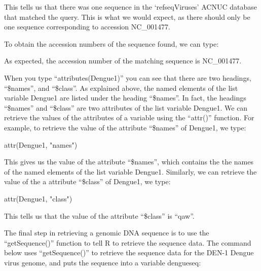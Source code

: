 \documentclass[
]{book}
\newenvironment{Shaded}{\begin{snugshade}}{\end{snugshade}}
\newcommand{\FunctionTok}[1]{\textcolor[rgb]{0.00,0.00,0.00}{#1}}
\newcommand{\NormalTok}[1]{#1}
\newcommand{\SpecialCharTok}[1]{\textcolor[rgb]{0.00,0.00,0.00}{#1}}
\newcommand{\StringTok}[1]{\textcolor[rgb]{0.31,0.60,0.02}{#1}}
\begin{document}
This tells us that there was one sequence in the `refseqViruses' ACNUC database that matched the query. This is what we would expect, as there should only be one sequence corresponding to accession NC\_001477.

To obtain the accession numbers of the sequence found, we can type:

\begin{Shaded}
\end{Shaded}

As expected, the accession number of the matching sequence is NC\_001477.

When you type ``attributes(Dengue1)'' you can see that there are two headings, ``\$names'', and ``\$class''. As explained above, the named elements of the list variable Dengue1 are listed under the heading ``\$names''. In fact, the headings ``\$names'' and ``\$class'' are two attributes of the list variable Dengue1. We can retrieve the values of the attributes of a variable using the ``attr()'' function. For example, to retrieve the value of the attribute ``\$names'' of Dengue1, we type:

\begin{Shaded}
\begin{Highlighting}[]
\FunctionTok{attr}\NormalTok{(Dengue1, }\StringTok{"names"}\NormalTok{)}
\end{Highlighting}
\end{Shaded}

This gives us the value of the attribute ``\$names'', which contains the the names of the named elements of the list variable Dengue1. Similarly, we can retrieve the value of the a attribute ``\$class'' of Dengue1, we type:

\begin{Shaded}
\begin{Highlighting}[]
\FunctionTok{attr}\NormalTok{(Dengue1, }\StringTok{"class"}\NormalTok{)}
\end{Highlighting}
\end{Shaded}

This tells us that the value of the attribute ``\$class'' is ``qaw''.

The final step in retrieving a genomic DNA sequence is to use the ``getSequence()'' function to tell R to retrieve the sequence data. The command below uses ``getSequence()'' to retrieve the sequence data for the DEN-1 Dengue virus genome, and puts the sequence into a variable dengueseq:
\end{document}
